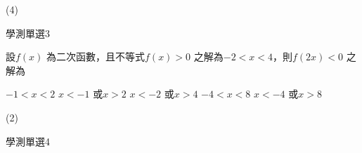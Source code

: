 \begin{QUESTIONS}
\begin{QUESTION}
\begin{QBODY}
        \end{QBODY}
        \begin{QFROMS}
        \end{QFROMS}
        \begin{QTAGS}\end{QTAGS}
        \begin{QANS}
            (4)
        \end{QANS}
        \begin{QSOLLIST}
        \end{QSOLLIST}
        \begin{QEMPTYSPACE}
        \end{QEMPTYSPACE}
    \end{QUESTION}
    \begin{QUESTION}
        \begin{ExamInfo}{86}{學測}{單選}{3}
        \end{ExamInfo}
        \begin{ExamAnsRateInfo}{}{}{}{}
        \end{ExamAnsRateInfo}
        \begin{QBODY}            
            設$f\left( x \right)$ 為二次函數，且不等式$f\left( x \right)>0$ 之解為$-2<x<4$，則$f\left( 2x \right)<0$ 之解為
            \begin{QOPS}
                \QOP  $-1<x<2$	
                \QOP  $x<-1$ 或$x>2$
                \QOP  $x<-2$ 或$x>4$	
                \QOP  $-4<x<8$
                \QOP  $x<-4$ 或$x>8$
            \end{QOPS}            
        \end{QBODY}
        \begin{QFROMS}
        \end{QFROMS}
        \begin{QTAGS}\end{QTAGS}
        \begin{QANS}
            (2)
        \end{QANS}
        \begin{QSOLLIST}
        \end{QSOLLIST}
        \begin{QEMPTYSPACE}
        \end{QEMPTYSPACE}
    \end{QUESTION}
    \begin{QUESTION}
        \begin{ExamInfo}{86}{學測}{單選}{4}
        \end{ExamInfo}
        \begin{ExamAnsRateInfo}{}{}{}{}

\end{ExamAnsRateInfo}
\end{QUESTION}
\end{QUESTIONS}
